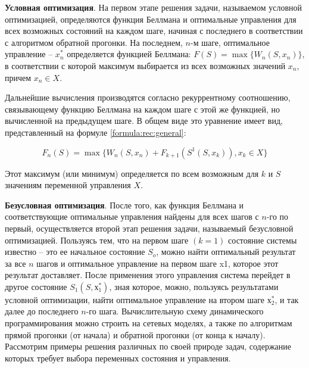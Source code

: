 \textbf{Условная оптимизация}. На первом этапе решения задачи, называемом условной оптимизацией, определяются функция Беллмана и оптимальные управления для всех возможных состояний на каждом шаге, начиная с последнего в соответствии с алгоритмом обратной прогонки. На последнем, $n$-м шаге, оптимальное управление – $x^*_n$ определяется функцией Беллмана: $F(S) = \max \{W_n (S, x_n)\}$, в соответствии с которой максимум выбирается из всех возможных значений $x_n$, причем $x_n \in X$.

Дальнейшие вычисления производятся согласно рекуррентному соотношению, связывающему функцию Беллмана на каждом шаге с этой же функцией, но вычисленной на предыдущем шаге. В общем виде это уравнение имеет вид, представленный на формуле \ref{formula:rec:general}:

\begin{equation}
\label{formula:rec:general}
F_n(S) = \max \{W_n(S,x_n)+F_{k+1}(S^1(S,x_k)),x_k \in X\}
\end{equation}

Этот максимум (или минимум) определяется по всем возможным для $k$ и $S$ значениям переменной управления $X$.

\textbf{Безусловная оптимизация}. После того, как функция Беллмана и соответствующие оптимальные управления найдены для всех шагов с $n$-го по первый, осуществляется второй этап решения задачи, называемый безусловной оптимизацией. Пользуясь тем, что на первом шаге $(k = 1)$ состояние системы известно – это ее начальное состояние $S_o$, можно найти оптимальный результат за все $n$ шагов и оптимальное управление на первом шаге x1, которое этот результат доставляет. После применения этого управления система перейдет в другое состояние $S_1(S,х^*_1)$, зная которое, можно, пользуясь результатами условной оптимизации, найти оптимальное управление на втором шаге $х^*_2$, и так далее до последнего $n$-го шага. Вычислительную схему динамического программирования можно строить на сетевых моделях, а также по алгоритмам прямой прогонки (от начала) и обратной прогонки (от конца к началу). Рассмотрим примеры решения различных по своей природе задач, содержание которых требует выбора переменных состояния и управления.